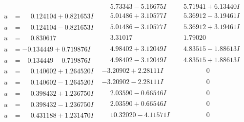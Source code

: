 \documentclass[1p]{elsarticle_modified}
\theoremstyle{definition}
\begin{document}
$$\begin{array}{c|c|c}
 & \phantom{-}5.73343 - 5.16675 I & \phantom{-}5.71941 + 6.13440 I \\ \hline\begin{aligned}
u &= \phantom{-}0.124104 + 0.821653 I\end{aligned}
 & \phantom{-}5.01486 + 3.10577 I & \phantom{-}5.36912 - 3.19461 I \\ \hline\begin{aligned}
u &= \phantom{-}0.124104 - 0.821653 I\end{aligned}
 & \phantom{-}5.01486 - 3.10577 I & \phantom{-}5.36912 + 3.19461 I \\ \hline\begin{aligned}
u &= \phantom{-}0.830617\phantom{ +0.000000I}\end{aligned}
 & \phantom{-}3.31017\phantom{ +0.000000I} & \phantom{-}1.79020\phantom{ +0.000000I} \\ \hline\begin{aligned}
u &= -0.134449 + 0.719876 I\end{aligned}
 & \phantom{-}4.98402 + 3.12049 I & \phantom{-}4.83515 - 1.88613 I \\ \hline\begin{aligned}
u &= -0.134449 - 0.719876 I\end{aligned}
 & \phantom{-}4.98402 - 3.12049 I & \phantom{-}4.83515 + 1.88613 I \\ \hline\begin{aligned}
u &= \phantom{-}0.140602 + 1.264520 I\end{aligned}
 & -3.20902 + 2.28111 I & \phantom{-0.000000 } 0 \\ \hline\begin{aligned}
u &= \phantom{-}0.140602 - 1.264520 I\end{aligned}
 & -3.20902 - 2.28111 I & \phantom{-0.000000 } 0 \\ \hline\begin{aligned}
u &= \phantom{-}0.398432 + 1.236750 I\end{aligned}
 & \phantom{-}2.03590 - 0.66546 I & \phantom{-0.000000 } 0 \\ \hline\begin{aligned}
u &= \phantom{-}0.398432 - 1.236750 I\end{aligned}
 & \phantom{-}2.03590 + 0.66546 I & \phantom{-0.000000 } 0 \\ \hline\begin{aligned}
u &= \phantom{-}0.431188 + 1.231470 I\end{aligned}
 & \phantom{-}10.32020 - 4.11571 I & \phantom{-0.000000 } 0 \\ \hline\begin{aligned}

\end{aligned}
\end{array}$$
\end{document}
